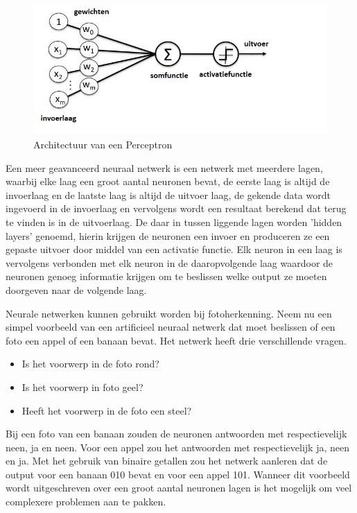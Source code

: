 \begin{figure}
	
	
	\includegraphics[width=\linewidth]{img/Perceptron.png}
	\caption{Architectuur van een Perceptron}
	\label{tab:perceptron}
\end{figure}

Een meer geavanceerd neuraal netwerk is een netwerk met meerdere lagen, waarbij elke laag een groot aantal neuronen bevat, de eerste laag is altijd de invoerlaag en de laatste laag is altijd de uitvoer laag, de gekende data wordt ingevoerd in de invoerlaag en vervolgens wordt een resultaat berekend dat terug te vinden is in de uitvoerlaag. De daar in tussen liggende lagen worden 'hidden layers' genoemd, hierin krijgen de neuronen een invoer en produceren ze een gepaste uitvoer door middel van een activatie functie.
Elk neuron in een laag is vervolgens verbonden met elk neuron in de daaropvolgende laag waardoor de neuronen genoeg informatie krijgen om te beslissen welke output ze moeten doorgeven naar de volgende laag.

Neurale netwerken kunnen gebruikt worden bij fotoherkenning.
Neem nu een simpel voorbeeld van een artificieel neuraal netwerk dat moet beslissen of een foto een appel of een banaan bevat.
Het netwerk heeft drie verschillende vragen.


\begin{itemize}
	\item Is het voorwerp in de foto rond?
	\item Is het voorwerp in foto geel?
	\item Heeft het voorwerp in de foto een steel?
\end{itemize}

Bij een foto van een banaan zouden de neuronen antwoorden met respectievelijk neen, ja en neen. Voor een appel zou het antwoorden met respectievelijk ja, neen en ja. Met het gebruik van binaire getallen zou het netwerk aanleren dat de output voor een banaan 010 bevat en voor een appel 101.
Wanneer dit voorbeeld wordt uitgeschreven over een groot aantal neuronen lagen is het mogelijk om veel complexere problemen aan te pakken.

